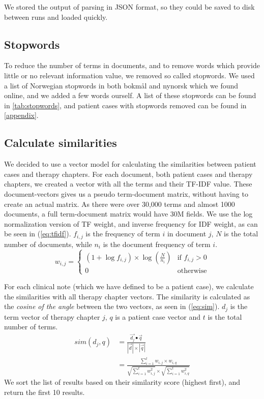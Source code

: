 \documentclass[a4paper, 11pt]{article}
\begin{document}
We stored the output of parsing in JSON format, so they could be saved to disk
between runs and loaded quickly.

\subsection{Stopwords}
To reduce the number of terms in documents, and to remove words which provide
little or no relevant information value, we removed so called stopwords.
We used a list of Norwegian stopwords in both bokmål and nynorsk which we
found online, and we added a few words ourself. A list of these stopwords can
be found in \autoref{tab:stopwords}, and patient cases with stopwords removed
can be found in \autoref{appendix}.

\subsection{Calculate similarities}
We decided to use a vector model for calculating the similarities between
patient cases and therapy chapters. For each document, both patient cases
and therapy chapters, we created a vector with all the terms and their
TF-IDF value. These document-vectors gives us a pseudo term-document matrix,
without having to create an actual matrix. As there were over 30,000 terms
and almost 1000 documents, a full term-document matrix would have 30M fields.
We use the log normalization version of TF weight, and inverse frequency for
IDF weight, as can be seen in (\ref{eq:tfidf}). \( f_{i,j} \) is the frequency
of term \( i \) in document \( j \), \( N \) is the total number of documents,
while \( n_{i} \) is the document frequency of term \( i \).
\begin{equation} \label{eq:tfidf}
	w_{i,j} =
	\begin{cases}
		(1 + \log f_{i,j}) \times \log(\frac{N}{n_{i}}) & \text{if } f_{i,j} > 0 \\
		0												& \text{otherwise}
	\end{cases}
\end{equation}

For each clinical note (which we have defined to be a patient case), we
calculate the similarities with all therapy chapter vectors. The similarity is
calculated as the \emph{cosine of the angle} between the two vectors, as seen
in (\ref{eq:sim}). \( d_{j} \) is the term vector of therapy chapter \( j \),
\( q \) is a patient case vector and \( t \) is the total number of terms.
\begin{align} \label{eq:sim}
	sim(d_{j}, q) &= \frac{\vec{d_{j}} \bullet \vec{q}}{|\vec{d}| \times |\vec{q}|} \nonumber \\
				  &= \frac{\sum_{i=1}^{t} w_{i,j} \times w_{i,q}}{\sqrt{\sum_{i=1}^{t} w_{i,j}^2} \times \sqrt{\sum_{i=1}^{t} w_{i,q}^2}}
\end{align}
We sort the list of results based on their similarity score (highest first),
and return the first 10 results.
\end{document}
